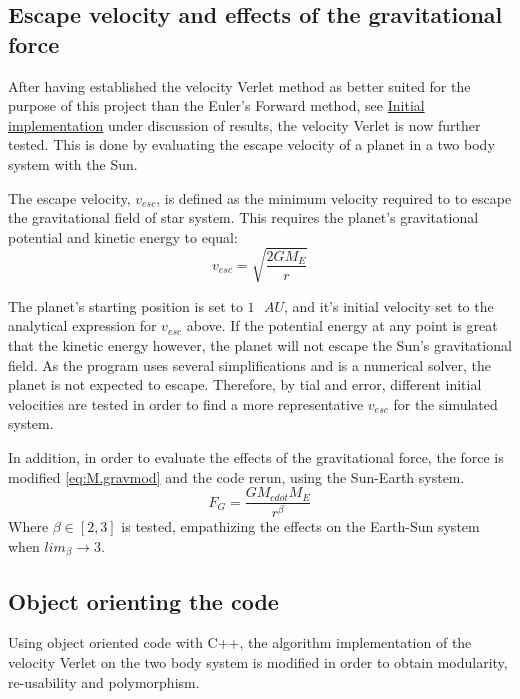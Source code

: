 \documentclass[%
oneside,                 %
final,                   %
10pt]{article}
\begin{document}
\subsection{Escape velocity and effects of the gravitational force}
After having established the velocity Verlet method as better suited for the purpose of this project than the Euler's Forward method, see \hyperref[subsec:Init_implm]{Initial implementation} under discussion of results, the velocity Verlet is now further tested. This is done by evaluating the escape velocity of a planet in a two body system with the Sun.  \newline

The escape velocity, $v_{esc}$, is defined as the minimum velocity required to to escape the gravitational field of star system. This requires the planet's gravitational potential and kinetic energy to equal:
\begin{equation}
v_{esc} = \sqrt{\frac{2 G M_E}{r}}
\end{equation}

The planet's starting position is set to $1 \text{ } AU$, and it's initial velocity set to the analytical expression for $v_{esc}$ above. If the potential energy at any point is great that the kinetic energy however, the planet will not escape the Sun's gravitational field. As the program uses several simplifications and is a numerical solver, the planet is not expected to escape. Therefore, by tial and error, different initial velocities are tested in order to find a more representative $v_{esc}$ for the simulated system.\newline

In addition, in order to evaluate the effects of the gravitational force, the force is modified \eqref{eq:M.gravmod} and the code rerun, using the Sun-Earth system.
\begin{equation}
F_G=\frac{GM_{cdot}M_{E}}{r^{\beta}}
\label{eq:M.gravmod}
\end{equation}
Where $\beta \in [2,3]$ is tested, empathizing the effects on the Earth-Sun system when $lim_{\beta} \rightarrow 3$.

 
\subsection{Object orienting the code}  
\label{sec:OOing}
Using object oriented code with C++, the algorithm implementation of the velocity Verlet on the two body system is modified in order to obtain modularity, re-usability and polymorphism.  \newline
\end{document}
